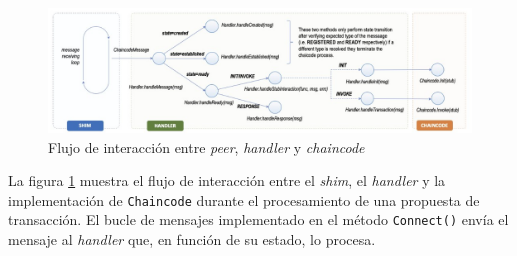 \begin{figure}[tbph]
\centering
\includegraphics[width=\textwidth]{Images/interaction_flow}
\caption{Flujo de interacción entre \textit{peer}, \textit{handler} y \textit{chaincode}}
\label{fig:interactionflow}
\end{figure}

La figura \ref{fig:interactionflow} muestra el flujo de interacción entre el \textit{shim}, el \textit{handler} y la implementación de \texttt{Chaincode} durante el procesamiento de una propuesta de transacción. El bucle de mensajes implementado en el método \texttt{Connect()} envía el mensaje al \textit{handler} que, en función de su estado, lo procesa. 
%







%
%
%
%

